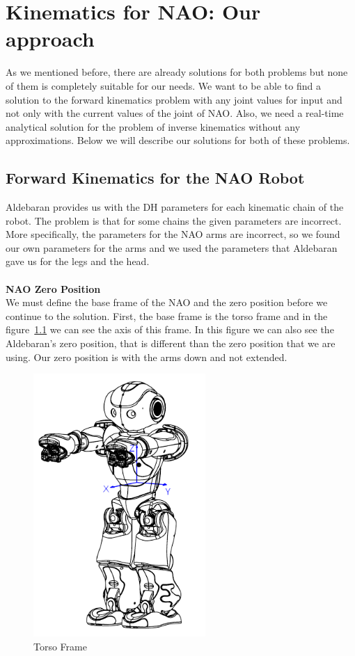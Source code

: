 \chapter{Kinematics for NAO: Our approach}
\label{approach}
As we mentioned before, there are already solutions for both problems but none of them is completely suitable for our needs. We want to be able to find a solution to the forward kinematics problem with any joint values for input and not only with the current values of the joint of NAO. Also, we need a real-time analytical solution for the problem of inverse kinematics without any approximations. Below we will describe our solutions for both of these problems.
\section{Forward Kinematics for the NAO Robot}
Aldebaran provides us with the DH parameters for each kinematic chain of the robot. The problem is that for some chains the given parameters are incorrect. More specifically, the parameters for the NAO arms are incorrect, so we found our own parameters for the arms and we used the parameters that Aldebaran gave us for the legs and the head.\\
\\

\textbf{NAO Zero Position}\\
We must define the base frame of the NAO and the zero position before we continue to the solution. First, the base frame is the torso frame and in the figure~\ref{fig:torso} we can see the axis of this frame. In this figure we can also see the Aldebaran's zero position, that is different than the zero position that we are using. Our zero position is with the arms down and not extended.

\begin{figure}[h]
	\begin{center}
		\includegraphics[height = 10cm]{Figures/torso_frame.png}
 		\caption{Torso Frame}
 		\label{fig:torso}
	\end{center}
\end{figure}


